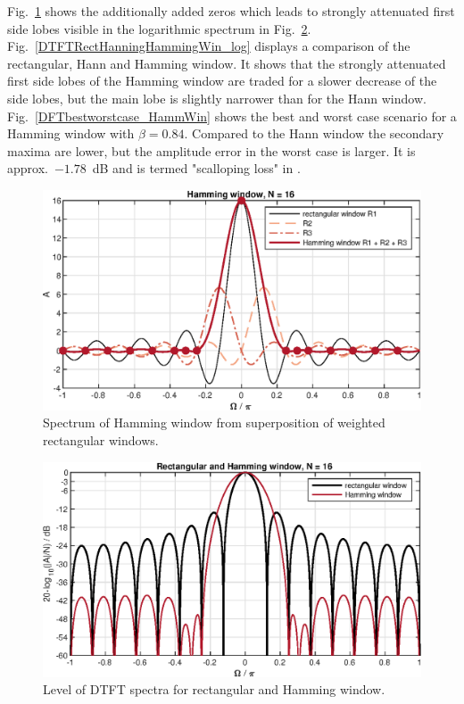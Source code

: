 \documentclass[11pt,a4paper,DIV=12]{scrartcl}
\begin{document}
Fig.~\ref{HammingausRectWindow} shows the additionally added zeros which leads
to strongly attenuated first side lobes visible in the logarithmic spectrum in
Fig.~\ref{DTFTHammingWin_log}.
%
Fig.~\ref{DTFTRectHanningHammingWin_log} displays a comparison of the
rectangular, Hann and Hamming window.
%
It shows that the strongly attenuated first side lobes of the Hamming window
are traded for a slower decrease of the side lobes, but the main lobe is
slightly narrower than for the Hann window.
%
Fig.~\ref{DFTbestworstcase_HammWin} shows the best and worst case scenario for
a Hamming window with $\beta=0.84$.
%
Compared to the Hann window the secondary maxima are lower, but the
amplitude error in the worst case is larger.
%
It is approx.~$-1.78$~dB and is termed "scalloping loss" in \cite{Harris1978}.
\begin{figure}
		\centering
		\includegraphics[]{graphics/HammingausRectWindow}
		\caption{Spectrum of Hamming window from superposition of weighted
		rectangular windows.}
		\label{HammingausRectWindow}
\end{figure}
\begin{figure}
		\centering
		\includegraphics[]{graphics/DTFTHammingWin_log}
		\caption{Level of DTFT spectra for rectangular and Hamming window.}
		\label{DTFTHammingWin_log}
\end{figure}
\end{document}
